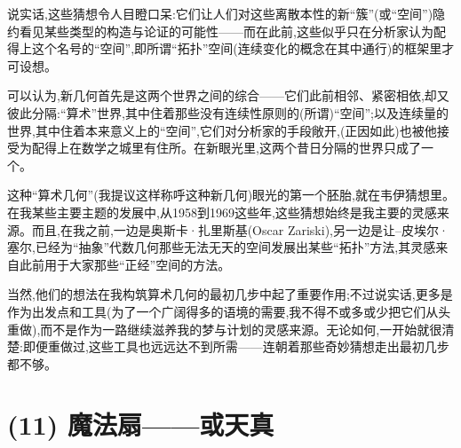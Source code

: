说实话,这些猜想令人目瞪口呆:它们让人们对这些离散本性的新“簇”(或“空间”)隐约看见某些类型的构造与论证的可能性——而在此前,这些似乎只在分析家认为配得上这个名号的“空间”,即所谓“拓扑”空间(连续变化的概念在其中通行)的框架里才可设想。

可以认为,新几何首先是这两个世界之间的综合——它们此前相邻、紧密相依,却又彼此分隔:“算术”世界,其中住着那些没有连续性原则的(所谓)“空间”;以及连续量的世界,其中住着本来意义上的“空间”,它们对分析家的手段敞开,(正因如此)也被他接受为配得上在数学之城里有住所。在新眼光里,这两个昔日分隔的世界只成了一个。

这种“算术几何”(我提议这样称呼这种新几何)眼光的第一个胚胎,就在韦伊猜想里。在我某些主要主题的发展中,从1958到1969这些年,这些猜想始终是我主要的灵感来源。而且,在我之前,一边是奥斯卡·扎里斯基(Oscar Zariski),另一边是让–皮埃尔·塞尔,已经为“抽象”代数几何那些无法无天的空间发展出某些“拓扑”方法,其灵感来自此前用于大家那些“正经”空间的方法。

当然,他们的想法在我构筑算术几何的最初几步中起了重要作用;不过说实话,更多是作为出发点和工具(为了一个广阔得多的语境的需要,我不得不或多或少把它们从头重做),而不是作为一路继续滋养我的梦与计划的灵感来源。无论如何,一开始就很清楚:即便重做过,这些工具也远远达不到所需——连朝着那些奇妙猜想走出最初几步都不够。

\section{(11) 魔法扇——或天真}

